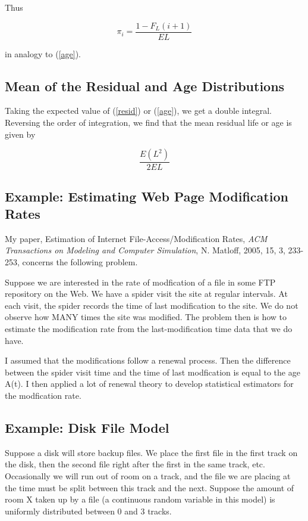 Thus

\begin{equation}
\label{piage}
\pi_i =  \frac{1 - F_L(i+1)} {EL}
\end{equation}

in analogy to (\ref{age}).

\subsection{Mean of the Residual and Age Distributions}

Taking the expected value of (\ref{resid}) or (\ref{age}), we get a
double integral.  Reversing the order of integration, we find that
the mean residual life or age is given by

\begin{equation}
\label{variancecounts}
\frac{E(L^2)}{2EL} 
\end{equation}

\subsection{Example:  Estimating Web Page Modification Rates}

My paper, Estimation of Internet File-Access/Modification Rates, {\it
ACM Transactions on Modeling and Computer Simulation}, N. Matloff, 2005,
15, 3, 233-253,    concerns the following problem.  

Suppose we are interested in the rate of modfication of a file in some
FTP repository on the Web.  We have a spider visit the site at regular
intervals.  At each visit, the spider records the time of last
modification to the site.  We do not observe how MANY times the site was
modified.  The problem then is how to estimate the modification rate
from the last-modification time data that we do have. 

I assumed that the modifications follow a renewal process.  Then the
difference between the spider visit time and the time of last
modfication is equal to the age A(t).  I then applied a lot of renewal
theory to develop statistical estimators for the modfication rate.  

\subsection{Example:  Disk File Model}

Suppose a disk will store backup files.  We place the first file in the
first track on the disk, then the second file right after the first in
the same track, etc.  Occasionally we will run out of room on a track,
and the file we are placing at the time must be split between this track
and the next.  Suppose the amount of room X taken up by a file (a
continuous random variable in this model) is uniformly distributed
between 0 and 3 tracks.  

